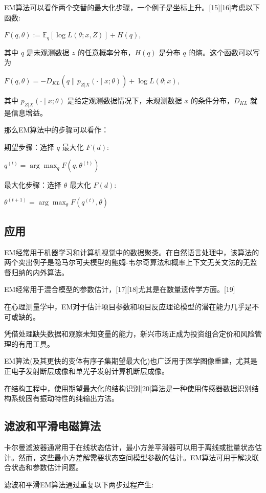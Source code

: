 EM算法可以看作两个交替的最大化步骤，一个例子是坐标上升。[15][16]考虑以下函数:

$F(q, \theta) := \mathbb{E}_q[\log L(\theta; x, Z)] + H(q)$,

其中 $q$ 是未观测数据 $z$ 的任意概率分布，$H(q)$ 是分布 $q$ 的熵。这个函数可以写为

$F(q, \theta) = -D_{KL}(q \parallel p_{Z|X}(\cdot \mid x; \theta)) + \log L(\theta; x)$,

其中 $p_{Z|X}(\cdot \mid x; \theta)$ 是给定观测数据情况下，未观测数据 $x$ 的条件分布，$D_{KL}$ 就是信息增益。

那么EM算法中的步骤可以看作：

期望步骤：选择 $q$ 最大化 $F(d)$:

$q^{(t)} = \arg \max_q F(q, \theta^{(t)})$

最大化步骤：选择 $\theta$ 最大化 $F(d)$:

$\theta^{(t+1)} = \arg \max_\theta F(q^{(t)}, \theta)$

\subsection{应用}

EM经常用于机器学习和计算机视觉中的数据聚类。在自然语言处理中，该算法的两个突出例子是隐马尔可夫模型的鲍姆-韦尔奇算法和概率上下文无关文法的无监督归纳的内外算法。

EM经常用于混合模型的参数估计，[17][18]尤其是在数量遗传学方面。[19]

在心理测量学中，EM对于估计项目参数和项目反应理论模型的潜在能力几乎是不可或缺的。

凭借处理缺失数据和观察未知变量的能力，新兴市场正成为投资组合定价和风险管理的有用工具。

EM算法(及其更快的变体有序子集期望最大化)也广泛用于医学图像重建，尤其是正电子发射断层成像和单光子发射计算机断层成像。

在结构工程中，使用期望最大化的结构识别[20]算法是一种使用传感器数据识别结构系统固有振动特性的纯输出方法。

\subsection{滤波和平滑电磁算法}

卡尔曼滤波器通常用于在线状态估计，最小方差平滑器可以用于离线或批量状态估计。然而，这些最小方差解需要状态空间模型参数的估计。EM算法可用于解决联合状态和参数估计问题。

滤波和平滑EM算法通过重复以下两步过程产生:

